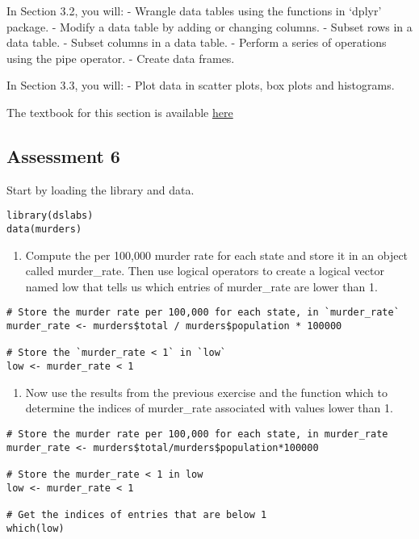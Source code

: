 \documentclass[
]{article}
\providecommand{\tightlist}{%
  \setlength{\itemsep}{0pt}\setlength{\parskip}{0pt}}
\begin{document}
In Section 3.2, you will: - Wrangle data tables using the functions in
`dplyr' package. - Modify a data table by adding or changing columns. -
Subset rows in a data table. - Subset columns in a data table. - Perform
a series of operations using the pipe operator. - Create data frames.

In Section 3.3, you will: - Plot data in scatter plots, box plots and
histograms.

The textbook for this section is available
\href{https://rafalab.github.io/dsbook/r-basics.html\#indexing}{here}

\hypertarget{assessment-6}{%
\subsection{Assessment 6}\label{assessment-6}}

Start by loading the library and data.

\begin{verbatim}
library(dslabs)
data(murders)
\end{verbatim}

\begin{enumerate}
\def\labelenumi{\arabic{enumi}.}
\tightlist
\item
  Compute the per 100,000 murder rate for each state and store it in an
  object called murder\_rate. Then use logical operators to create a
  logical vector named low that tells us which entries of murder\_rate
  are lower than 1.
\end{enumerate}

\begin{verbatim}
# Store the murder rate per 100,000 for each state, in `murder_rate`
murder_rate <- murders$total / murders$population * 100000

# Store the `murder_rate < 1` in `low` 
low <- murder_rate < 1
\end{verbatim}

\begin{enumerate}
\def\labelenumi{\arabic{enumi}.}
\setcounter{enumi}{1}
\tightlist
\item
  Now use the results from the previous exercise and the function which
  to determine the indices of murder\_rate associated with values lower
  than 1.
\end{enumerate}

\begin{verbatim}
# Store the murder rate per 100,000 for each state, in murder_rate
murder_rate <- murders$total/murders$population*100000

# Store the murder_rate < 1 in low 
low <- murder_rate < 1

# Get the indices of entries that are below 1
which(low)
\end{verbatim}
\end{document}
